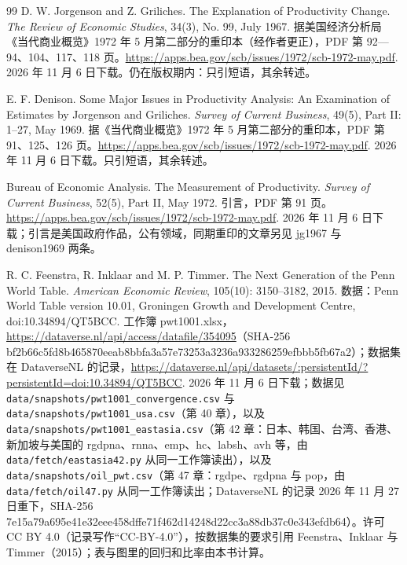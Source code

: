 \begin{thebibliography}{99}
 D. W. Jorgenson and Z. Griliches. The Explanation of Productivity Change. \emph{The Review of Economic Studies}, 34(3), No. 99, July 1967. 据美国经济分析局《当代商业概览》1972 年 5 月第二部分的重印本（经作者更正），PDF 第 92—94、104、117、118 页。\url{https://apps.bea.gov/scb/issues/1972/scb-1972-may.pdf}. 2026 年 11 月 6 日下载。仍在版权期内：只引短语，其余转述。

 E. F. Denison. Some Major Issues in Productivity Analysis: An Examination of Estimates by Jorgenson and Griliches. \emph{Survey of Current Business}, 49(5), Part II: 1--27, May 1969. 据《当代商业概览》1972 年 5 月第二部分的重印本，PDF 第 91、125、126 页。\url{https://apps.bea.gov/scb/issues/1972/scb-1972-may.pdf}. 2026 年 11 月 6 日下载。只引短语，其余转述。

 Bureau of Economic Analysis. The Measurement of Productivity. \emph{Survey of Current Business}, 52(5), Part II, May 1972. 引言，PDF 第 91 页。\url{https://apps.bea.gov/scb/issues/1972/scb-1972-may.pdf}. 2026 年 11 月 6 日下载；引言是美国政府作品，公有领域，同期重印的文章另见 jg1967 与 denison1969 两条。

 R. C. Feenstra, R. Inklaar and M. P. Timmer. The Next Generation of the Penn World Table. \emph{American Economic Review}, 105(10): 3150--3182, 2015. 数据：Penn World Table version 10.01, Groningen Growth and Development Centre, doi:10.34894/QT5BCC. 工作簿 pwt1001.xlsx，\url{https://dataverse.nl/api/access/datafile/354095}（SHA-256 bf2b66c5fd8b465870eeab8bbfa3a57e73253a3236a933286259efbbb5fb67a2）；数据集在 DataverseNL 的记录，\url{https://dataverse.nl/api/datasets/:persistentId/?persistentId=doi:10.34894/QT5BCC}. 2026 年 11 月 6 日下载；数据见 \texttt{data/snapshots/pwt1001\_convergence.csv} 与 \texttt{data/snapshots/pwt1001\_usa.csv}（第 40 章），以及 \texttt{data/snapshots/pwt1001\_eastasia.csv}（第 42 章：日本、韩国、台湾、香港、新加坡与美国的 rgdpna、rnna、emp、hc、labsh、avh 等，由 \texttt{data/fetch/eastasia42.py} 从同一工作簿读出），以及 \texttt{data/snapshots/oil\_pwt.csv}（第 47 章：rgdpe、rgdpna 与 pop，由 \texttt{data/fetch/oil47.py} 从同一工作簿读出；DataverseNL 的记录 2026 年 11 月 27 日重下，SHA-256 7e15a79a695e41e32eee458dffe71f462d14248d22cc3a88db37c0e343efdb64）。许可 CC BY 4.0（记录写作“CC-BY-4.0”），按数据集的要求引用 Feenstra、Inklaar 与 Timmer（2015）；表与图里的回归和比率由本书计算。


\end{thebibliography}
